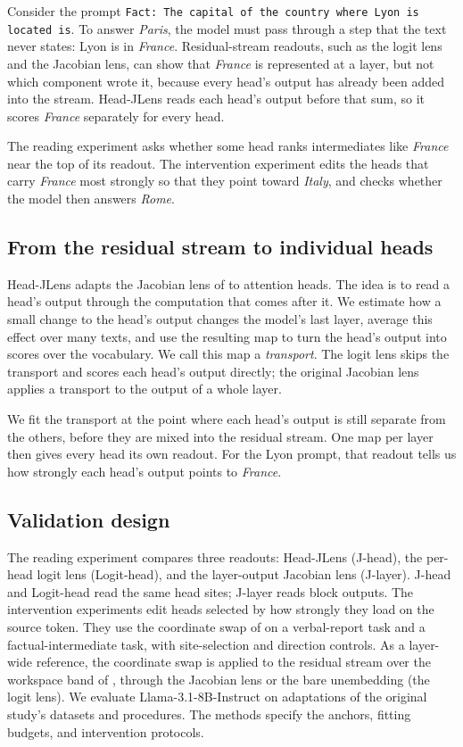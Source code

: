 \documentclass[11pt,a4paper]{article}
\newcommand{\code}[1]{\texttt{#1}}       %
\begin{document}
Consider the prompt \code{Fact: The capital of the country where Lyon is located is}. To answer \emph{Paris}, the model must pass through a step that the text never states: Lyon is in \emph{France}. Residual-stream readouts, such as the logit lens and the Jacobian lens, can show that \emph{France} is represented at a layer, but not which component wrote it, because every head's output has already been added into the stream. Head-JLens reads each head's output before that sum, so it scores \emph{France} separately for every head.

The reading experiment asks whether some head ranks intermediates like \emph{France} near the top of its readout. The intervention experiment edits the heads that carry \emph{France} most strongly so that they point toward \emph{Italy}, and checks whether the model then answers \emph{Rome}.

\subsection*{From the residual stream to individual heads}

Head-JLens adapts the Jacobian lens of \citet{gurnee2026} to attention heads. The idea is to read a head's output through the computation that comes after it. We estimate how a small change to the head's output changes the model's last layer, average this effect over many texts, and use the resulting map to turn the head's output into scores over the vocabulary. We call this map a \emph{transport}. The logit lens skips the transport and scores each head's output directly; the original Jacobian lens applies a transport to the output of a whole layer.

We fit the transport at the point where each head's output is still separate from the others, before they are mixed into the residual stream. One map per layer then gives every head its own readout. For the Lyon prompt, that readout tells us how strongly each head's output points to \emph{France}.

\subsection*{Validation design}

The reading experiment compares three readouts: Head-JLens (J-head), the per-head logit lens (Logit-head), and the layer-output Jacobian lens (J-layer). J-head and Logit-head read the same head sites; J-layer reads block outputs. The intervention experiments edit heads selected by how strongly they load on the source token. They use the coordinate swap of \citet{gurnee2026} on a verbal-report task and a factual-intermediate task, with site-selection and direction controls. As a layer-wide reference, the coordinate swap is applied to the residual stream over the workspace band of \citet{gurnee2026}, through the Jacobian lens or the bare unembedding (the logit lens). We evaluate Llama-3.1-8B-Instruct on adaptations of the original study's datasets and procedures. The methods specify the anchors, fitting budgets, and intervention protocols.
\end{document}
